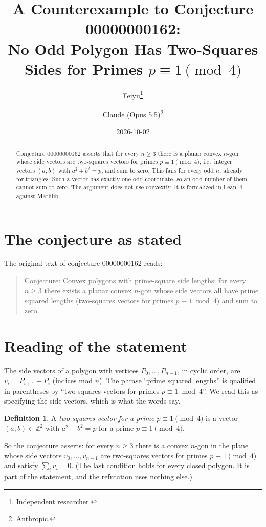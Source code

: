 \documentclass[11pt]{article}
\title{A Counterexample to Conjecture 00000000162:\\
No Odd Polygon Has Two-Squares Sides for Primes $p\equiv1\pmod4$}
\author{%
  Feiyu\thanks{Independent researcher.}
  \and
  Claude (Opus 5.5)\thanks{Anthropic.}%
}
\date{2026-10-02}
\theoremstyle{plain}
\theoremstyle{definition}
\newtheorem{definition}[theorem]{Definition}
\theoremstyle{remark}
\begin{document}
\maketitle

\begin{abstract}
Conjecture 00000000162 asserts that for every $n\ge3$ there is a planar convex
$n$-gon whose side vectors are two-squares vectors for primes $p\equiv1\pmod4$,
i.e.\ integer vectors $(a,b)$ with $a^2+b^2=p$, and sum to zero. This fails
for every odd $n$, already for triangles. Such a vector has exactly one odd
coordinate, so an odd number of them cannot sum to zero. The argument does not
use convexity. It is formalized in Lean~4 against Mathlib.
\end{abstract}

\section{The conjecture as stated}

The original text of conjecture 00000000162 reads:

\begin{quote}
Conjecture: Convex polygons with prime-square side lengths: for every
$n \ge 3$ there exists a planar convex $n$-gon whose side vectors all have
prime squared lengths (two-squares vectors for primes $p \equiv 1 \bmod 4$) and
sum to zero.
\end{quote}

\section{Reading of the statement}

The side vectors of a polygon with vertices $P_0,\ldots,P_{n-1}$, in cyclic
order, are $v_i=P_{i+1}-P_i$ (indices mod $n$). The phrase ``prime squared
lengths'' is qualified in parentheses by ``two-squares vectors for primes
$p\equiv1 \bmod 4$''. We read this as specifying the side vectors, which is
what the words say.

\begin{definition}
A \emph{two-squares vector for a prime $p\equiv1\pmod4$} is a vector
$(a,b)\in\mathbb Z^2$ with $a^2+b^2=p$ for a prime $p\equiv1\pmod 4$.
\end{definition}

So the conjecture asserts: for every $n\ge3$ there is a convex $n$-gon in the
plane whose side vectors $v_0,\ldots,v_{n-1}$ are two-squares vectors for
primes $p\equiv1\pmod4$ and satisfy $\sum_i v_i=0$. (The last condition holds
for every closed polygon. It is part of the statement, and the refutation uses
nothing else.)
\end{document}
